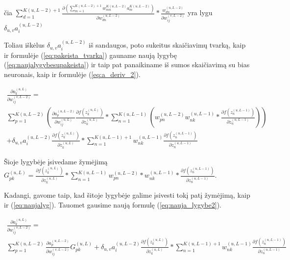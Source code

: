 čia \begin{math} \sum_{d=1}^{K(u,L-2)+1} \frac{\partial (\sum_{m=1}^{K(u,L-2)+1} w_{mn}^{K(u,L-2)} a_m^{K(u,L-2)})}{\partial w_{dn}^{(u,L-2)}} *
\frac{w_{dn}^{(u,L-2)}}{\partial w_{ij}^{(v,L-2)}}\end{math} yra lygu \begin{math}\delta_{u,v}a_i^{(u,L-2)}\end{math}

Toliau iškėlus \begin{math}\delta_{u,v}a_i^{(u,L-2)}\end{math} iš sandaugos, poto sukeitus skaičiavimų tvarką, kaip ir formulėje (\ref{eq:pakeista_tvarka}) gauname naują lygybę (\ref{eq:naujalygybesupakeista}) ir taip pat panaikiname iš sumos skaičiavimą su bias neuronais, kaip ir formulėje (\ref{eq:a_deriv_2}).

\begin{equation}\label{eq:naujalygybesupakeista}
  \begin{aligned}
  \frac{\partial a_k^{(u, L)}}{\partial w_{ij}^{(v,L-2)}} =\\
  \sum_{p=1}^{K(u,L-2)}( \frac{\partial a_p^{(u,L-2)}}{\partial w_{ij}^{(u,L)}}\frac{\partial f(z_k^{(u,L)})}{\partial z_k^{(u,L)}}    *
  \sum_{n=1}^{K(u,L-1)}( w_{pn}^{(u,L-2)}w_{nk}^{(u,L-1)}*\frac{\partial f(z_n^{(u,L-1)})}{\partial z_n^{(u,L-1)}}))\\
  +
   \delta_{u,v}a_i^{(u,L-2)}\frac{\partial f(z_k^{(u,L)})}{\partial z_k^{(u,L)}}*
  \sum_{n=1}^{K(u,L-1)+1} w_{nk}^{(u,L-1)} \frac{\partial f(z_n^{(u,L-1)})}{\partial z_n^{(u,L-1)}}
  \end{aligned}
\end{equation}


Šioje lygybėje įsivedame žymėjimą \begin{math}G_{pk}^{(u,L)} =
\frac{\partial f(z_k^{(u, L)})}{\partial z_k^{(u,L)}}
*
\sum_{n=1}^{K(u, L-1)} w_{pn}^{(u,L-2)} * w_{nk}^{(u,L-1)} * \frac{\partial f(z_n^{(u, L-1)})}{\partial z_n^{(u,L-1)}}\end{math}.

Kadangi, gavome taip, kad šitoje lygybėje galime įsivesti tokį patį žymėjimą, kaip ir (\ref{eq:naujalyg}). Tauomet gausime naują formulę (\ref{eq:nauja_lygybe2}).


\begin{equation}\label{eq:nauja_lygybe2}
  \begin{aligned}
    \frac{\partial a_k^{(u, L)}}{\partial w_{ij}^{(v,L-2)}} = \\
    \sum_{p=1}^{K(u,L-2)}
    \frac{\partial a_p^{(u,L-2)}}{\partial w_{ij}^{(v,L-2)}}G_{pk}^{(u,L)} +    \delta_{u,v}a_i^{(u,L-2)}\frac{\partial f(z_k^{(u,L)})}{\partial z_k^{(u,L)}}*
      \sum_{n=1}^{K(u,L-1)+1} w_{nk}^{(u,L-1)} \frac{\partial f(z_n^{(u,L-1)})}{\partial z_n^{(u,L-1)}}
  \end{aligned}
\end{equation}

